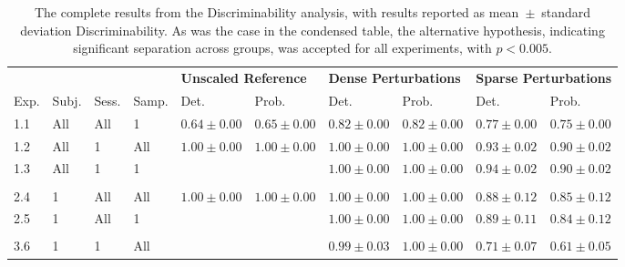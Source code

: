 \documentclass[10pt,letterpaper]{article}
\begin{document}
\begin{table}[ht]\centering
\caption{The complete results from the Discriminability analysis, with results
reported as mean~$\pm$~standard deviation Discriminability. As was the case in the
condensed table, the alternative hypothesis, indicating significant separation
across groups, was accepted for all experiments, with $p < 0.005$.}
\vspace{5pt}
\begin{tabular}{llll|ll|ll|ll}
  &  &  &  &  \multicolumn{2}{l|}{\textbf{Unscaled Reference}} & \multicolumn{2}{l|}{\textbf{Dense Perturbations}} &  \multicolumn{2}{l}{\textbf{Sparse Perturbations}} \\
Exp. & Subj. & Sess. & Samp. & Det. &  Prob. &  Det. &    Prob. &     Det. &    Prob. \\
\hline
1.1        &          All &      All &          1 & \cellcolor{color1!10}$ 0.64 \pm 0.00 $ & \cellcolor{color1!10}$ 0.65 \pm 0.00 $  & \cellcolor{color1!10}$ 0.82 \pm 0.00 $ & \cellcolor{color1!10}$ 0.82 \pm 0.00 $ & \cellcolor{color1!10}$ 0.77 \pm 0.00 $ & \cellcolor{color1!10}$ 0.75 \pm 0.00 $ \\
1.2        &          All &        1 &        All &  $ 1.00 \pm 0.00 $ &  $ 1.00 \pm 0.00 $ &  $ 1.00 \pm 0.00 $ &  $ 1.00 \pm 0.00 $ &  $ 0.93 \pm 0.02 $ &  $ 0.90 \pm 0.02 $ \\
1.3        &          All &        1 &          1 &        &  &  $ 1.00 \pm 0.00 $ &  $ 1.00 \pm 0.00 $ &  $ 0.94 \pm 0.02 $ &  $ 0.90 \pm 0.02 $ \\
& & & & & & & & & \vspace{-5pt}\\
2.4        &            1 &      All &        All &  \cellcolor{color1!10}$ 1.00 \pm 0.00 $ &  \cellcolor{color1!10}$ 1.00 \pm 0.00 $  &  \cellcolor{color1!10}$ 1.00 \pm 0.00 $ &  \cellcolor{color1!10}$ 1.00 \pm 0.00 $ &  \cellcolor{color1!10}$ 0.88 \pm 0.12 $ &  \cellcolor{color1!10}$ 0.85 \pm 0.12 $ \\
2.5        &            1 &      All &          1 &        &  &  $ 1.00 \pm 0.00 $ &  $ 1.00 \pm 0.00 $ &  $ 0.89 \pm 0.11 $ &  $ 0.84 \pm 0.12 $ \\
& & & & & & & & & \vspace{-5pt}\\
3.6        &            1 &        1 &        All &         &  &  \cellcolor{color1!10}$ 0.99 \pm 0.03 $ &  \cellcolor{color1!10}$ 1.00 \pm 0.00 $ &  \cellcolor{color1!10}$ 0.71 \pm 0.07 $ &  \cellcolor{color1!10}$ 0.61 \pm 0.05 $ \\
\end{tabular}
\label{stab:discrim_full}
\end{table}
\end{document}
